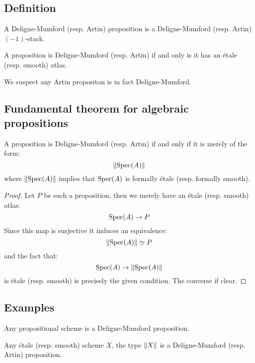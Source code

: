 \subsection{Definition}

\begin{definition}
A Deligne-Mumford (resp. Artin) proposition is a Deligne-Mumford (resp. Artin) $(-1)$-stack.
\end{definition}

\begin{remark}
A proposition is Deligne-Mumford (resp. Artin) if and only is it has an étale (resp. smooth) atlas.
\end{remark}

We suspect any Artin propositon is in fact Deligne-Mumford.

\subsection{Fundamental theorem for algebraic propositions}

\begin{proposition}
A proposition is Deligne-Mumford (resp. Artin) if and only if it is merely of the form:
\[\lVert \operatorname{Spec}(A) \rVert\]
where $\lVert \operatorname{Spec}(A) \rVert$ implies that $\operatorname{Spec}(A)$ is formally étale (resp. formally smooth).
\end{proposition}

\begin{proof}
Let $P$ be such a proposition, then we merely have an étale (resp. smooth) atlas:
\[\operatorname{Spec}(A)\to P\]
Since this map is surjective it induces an equivalence:
\[\lVert \operatorname{Spec}(A) \rVert \simeq P\]
and the fact that:
\[\operatorname{Spec}(A)\to \lVert \operatorname{Spec}(A) \rVert\]
is étale (resp. smooth) is precisely the given condition. The converse if clear.
\end{proof}

\subsection{Examples}

\begin{lemma}
Any propositional scheme is a Deligne-Mumford proposition.
\end{lemma}

\begin{lemma}
Any étale (resp. smooth) scheme $X$, the type $\lVert X \rVert$ is a Deligne-Mumford (resp. Artin) proposition.
\end{lemma}

